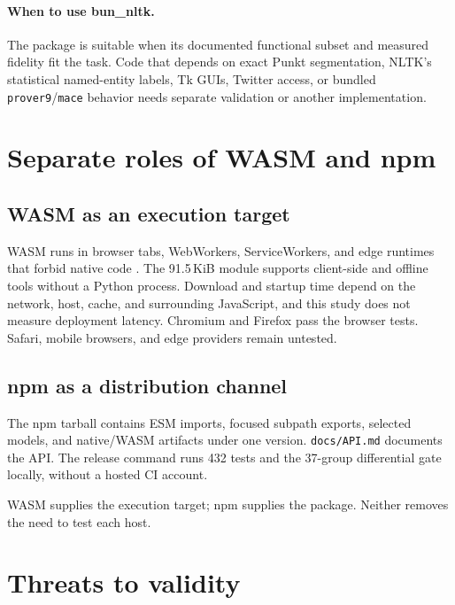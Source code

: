 \documentclass[pdflatex,sn-mathphys-num]{sn-jnl}
\theoremstyle{thmstyleone}
\begin{document}
\paragraph{When to use bun\_nltk.}
The package is suitable when its documented functional subset and measured fidelity fit the task. Code that depends on exact Punkt segmentation, NLTK's statistical named-entity labels, Tk GUIs, Twitter access, or bundled \texttt{prover9}/\texttt{mace} behavior needs separate validation or another implementation.

\section{Separate roles of WASM and npm}\label{sec:unlocks}

\subsection{WASM as an execution target}

WASM runs in browser tabs, WebWorkers, ServiceWorkers, and edge runtimes that forbid native code \cite{wasm2023,cloudflare2024}. The 91.5\,KiB module supports client-side and offline tools without a Python process. Download and startup time depend on the network, host, cache, and surrounding JavaScript, and this study does not measure deployment latency. Chromium and Firefox pass the browser tests. Safari, mobile browsers, and edge providers remain untested.

\subsection{npm as a distribution channel}

The npm tarball contains ESM imports, focused subpath exports, selected models, and native/WASM artifacts under one version. \texttt{docs/API.md} documents the API. The release command runs 432 tests and the 37-group differential gate locally, without a hosted CI account.

WASM supplies the execution target; npm supplies the package. Neither removes the need to test each host.

\section{Threats to validity}\label{sec:threats}
\end{document}
